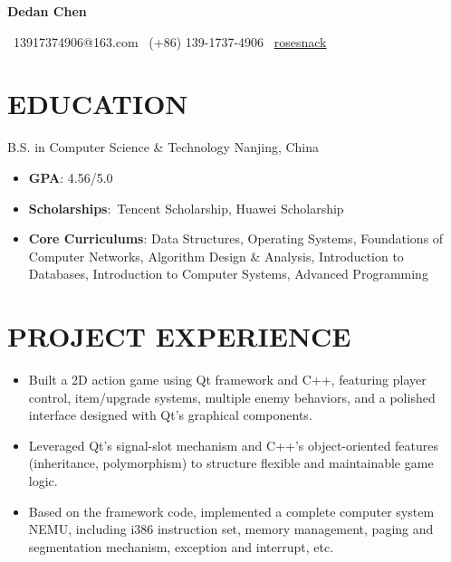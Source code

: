 \documentclass{resume}
\begin{document}

\centerline{\huge \bf Dedan Chen}
\vspace{1ex}
\centerline{
    \small \faEnvelope~13917374906@163.com \quad \faPhone~(+86) 139-1737-4906 \quad \faGithub~\href{https://github.com/rosesnack}{rosesnack}
}


\section{\bf EDUCATION}

B.S. in Computer Science \& Technology \hfill Nanjing, China

\begin{itemize}
    \item  \textbf{GPA}: 4.56/5.0
    \item \textbf{Scholarships}: Tencent Scholarship, Huawei Scholarship
    \item \textbf{Core Curriculums}: Data Structures, Operating Systems, Foundations of Computer Networks, Algorithm Design \& Analysis, Introduction to Databases, Introduction to Computer Systems, Advanced Programming
\end{itemize}


\section{\bf PROJECT EXPERIENCE}

\begin{itemize}
    \item Built a 2D action game using Qt framework and C++, featuring player control, item/upgrade systems, multiple enemy behaviors, and a polished interface designed with Qt’s graphical components.
    \item Leveraged Qt's signal-slot mechanism and C++'s object-oriented features (inheritance, polymorphism) to structure flexible and maintainable game logic.
\end{itemize}

\begin{itemize}
    \item Based on the framework code, implemented a complete computer system NEMU, including i386 instruction set, memory management, paging and segmentation mechanism, exception and interrupt, etc.
\end{itemize}
\end{document}
